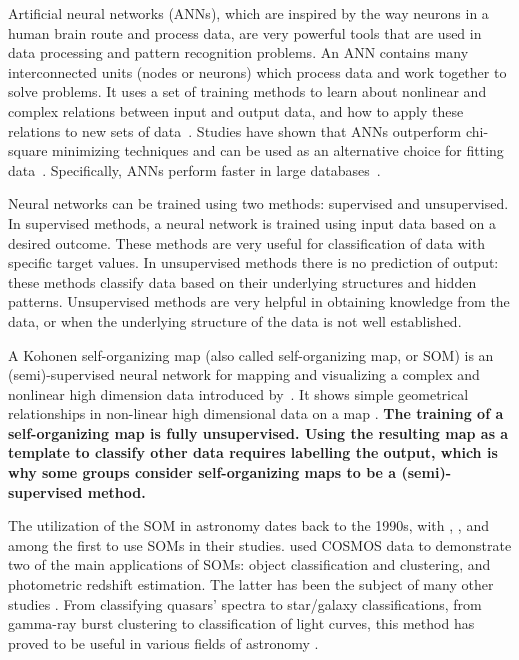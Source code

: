Artificial neural networks (ANNs), which are inspired by the way neurons in a human brain route and process data, are very powerful tools that are used in data processing and pattern recognition problems.
An ANN contains many interconnected units (nodes or neurons) which process data and work together to solve problems.
It uses a set of training methods to learn about nonlinear and complex relations between input and output data, and how to apply these relations to new sets of data~\citep[e.g.][]{Hossein14,Hossein16a,Hossein16b,Ellison16a, Ellison16b}.
Studies have shown that ANNs outperform chi-square minimizing techniques and can be used as an alternative choice for fitting data~\citep[e.g.][]{Marquez91}.
Specifically, ANNs perform faster in large databases~\citep[][]{Gulati97}.

Neural networks can be trained using two methods: supervised and unsupervised.
In supervised methods, a neural network is trained using input data based on a desired outcome.
These methods are very useful for classification of data with specific target values.
In unsupervised methods there is no prediction of output:
these methods classify data based on their underlying structures and hidden patterns.
Unsupervised methods are very helpful in obtaining knowledge from the data, or when the underlying structure of the data is not well established.

A Kohonen self-organizing map (also called self-organizing map, or SOM) is an (semi)-supervised neural network for mapping and visualizing a complex and nonlinear high dimension data introduced by~\citet{Kohonen82}.
It shows simple geometrical relationships in non-linear high dimensional data on a map \citep{Kohonen98}.
\textbf{The training of a self-organizing map is fully unsupervised.
     Using the resulting map as a template to classify other data requires labelling the output, which is why some groups consider self-organizing maps to be a (semi)-supervised method.}


The utilization of the SOM in astronomy dates back to the 1990s, with \citet[][]{Odewahn92}, \citet[][]{Hernandez94}, and \citet[][]{Murtagh95} among the first to use SOMs in their studies.
\citet{Geach12} used COSMOS data to demonstrate two of the main applications of SOMs: object classification and clustering, and photometric redshift estimation. The latter has been the subject of many other studies \citep[e.g.][]{Kind14a}.
From classifying quasars' spectra to star/galaxy classifications, from gamma-ray burst clustering to classification of light curves, this method has proved to be useful in various fields of astronomy \citep[e.g.][]{Maehoenen95, Miller96, Andreon00, Balastegui01, Rajaniemi02, Brett04, Scaringi09}.


